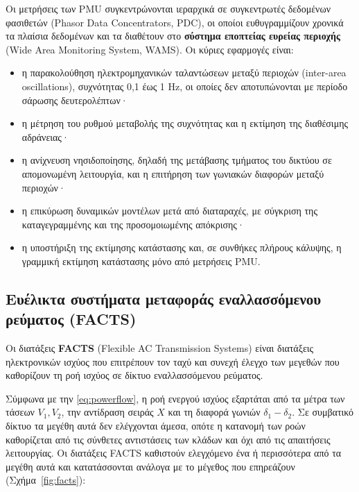 Οι μετρήσεις των PMU συγκεντρώνονται ιεραρχικά σε συγκεντρωτές δεδομένων φασιθετών (Phasor
Data Concentrators, PDC), οι οποίοι ευθυγραμμίζουν χρονικά τα πλαίσια δεδομένων και τα
διαθέτουν στο \textbf{σύστημα εποπτείας ευρείας περιοχής} (Wide Area Monitoring System,
WAMS). Οι κύριες εφαρμογές είναι:

\begin{itemize}
\item η παρακολούθηση ηλεκτρομηχανικών ταλαντώσεων μεταξύ περιοχών (inter-area
      oscillations), συχνότητας 0,1 έως 1 Hz, οι οποίες δεν αποτυπώνονται με περίοδο
      σάρωσης δευτερολέπτων·
\item η μέτρηση του ρυθμού μεταβολής της συχνότητας και η εκτίμηση της διαθέσιμης
      αδράνειας·
\item η ανίχνευση νησιδοποίησης, δηλαδή της μετάβασης τμήματος του δικτύου σε απομονωμένη
      λειτουργία, και η επιτήρηση των γωνιακών διαφορών μεταξύ περιοχών·
\item η επικύρωση δυναμικών μοντέλων μετά από διαταραχές, με σύγκριση της καταγεγραμμένης
      και της προσομοιωμένης απόκρισης·
\item η υποστήριξη της εκτίμησης κατάστασης και, σε συνθήκες πλήρους κάλυψης, η
      γραμμική εκτίμηση κατάστασης μόνο από μετρήσεις PMU.
\end{itemize}

\subsection{Ευέλικτα συστήματα μεταφοράς εναλλασσόμενου ρεύματος (FACTS)}

Οι διατάξεις \textbf{FACTS} (Flexible AC Transmission Systems) είναι διατάξεις ηλεκτρονικών
ισχύος που επιτρέπουν τον ταχύ και συνεχή έλεγχο των μεγεθών που καθορίζουν τη ροή ισχύος
σε δίκτυο εναλλασσόμενου ρεύματος.

Σύμφωνα με την \eqref{eq:powerflow}, η ροή ενεργού ισχύος εξαρτάται από τα μέτρα των τάσεων
$V_1, V_2$, την αντίδραση σειράς $X$ και τη διαφορά γωνιών $\delta_1 - \delta_2$. Σε
συμβατικό δίκτυο τα μεγέθη αυτά δεν ελέγχονται άμεσα, οπότε η κατανομή των ροών καθορίζεται
από τις σύνθετες αντιστάσεις των κλάδων και όχι από τις απαιτήσεις λειτουργίας. Οι διατάξεις
FACTS καθιστούν ελεγχόμενο ένα ή περισσότερα από τα μεγέθη αυτά και κατατάσσονται ανάλογα με
το μέγεθος που επηρεάζουν (Σχήμα~\ref{fig:facts}):

